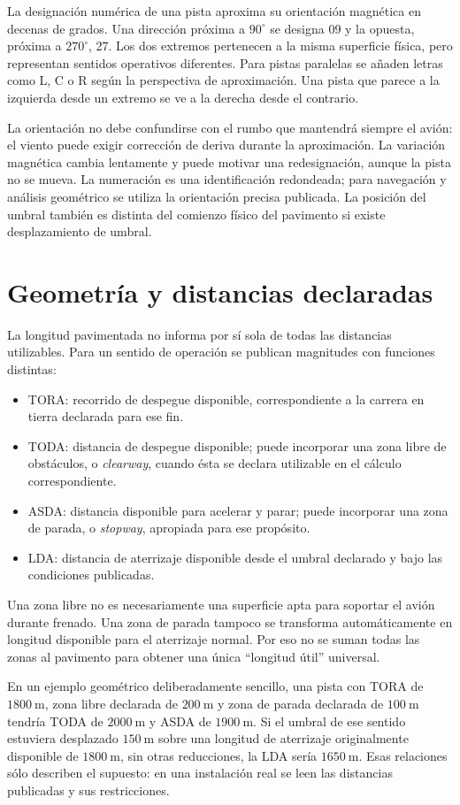 La designación numérica de una pista aproxima su orientación magnética en decenas de grados. Una dirección próxima a $90^\circ$ se designa 09 y la opuesta, próxima a $270^\circ$, 27. Los dos extremos pertenecen a la misma superficie física, pero representan sentidos operativos diferentes. Para pistas paralelas se añaden letras como L, C o R según la perspectiva de aproximación. Una pista que parece a la izquierda desde un extremo se ve a la derecha desde el contrario.

La orientación no debe confundirse con el rumbo que mantendrá siempre el avión: el viento puede exigir corrección de deriva durante la aproximación. La variación magnética cambia lentamente y puede motivar una redesignación, aunque la pista no se mueva. La numeración es una identificación redondeada; para navegación y análisis geométrico se utiliza la orientación precisa publicada. La posición del umbral también es distinta del comienzo físico del pavimento si existe desplazamiento de umbral.

\section{Geometría y distancias declaradas}
La longitud pavimentada no informa por sí sola de todas las distancias utilizables. Para un sentido de operación se publican magnitudes con funciones distintas:
\begin{itemize}
\item TORA: recorrido de despegue disponible, correspondiente a la carrera en tierra declarada para ese fin.
\item TODA: distancia de despegue disponible; puede incorporar una zona libre de obstáculos, o \emph{clearway}, cuando ésta se declara utilizable en el cálculo correspondiente.
\item ASDA: distancia disponible para acelerar y parar; puede incorporar una zona de parada, o \emph{stopway}, apropiada para ese propósito.
\item LDA: distancia de aterrizaje disponible desde el umbral declarado y bajo las condiciones publicadas.
\end{itemize}
Una zona libre no es necesariamente una superficie apta para soportar el avión durante frenado. Una zona de parada tampoco se transforma automáticamente en longitud disponible para el aterrizaje normal. Por eso no se suman todas las zonas al pavimento para obtener una única ``longitud útil'' universal.

En un ejemplo geométrico deliberadamente sencillo, una pista con TORA de $1800\ \mathrm m$, zona libre declarada de $200\ \mathrm m$ y zona de parada declarada de $100\ \mathrm m$ tendría TODA de $2000\ \mathrm m$ y ASDA de $1900\ \mathrm m$. Si el umbral de ese sentido estuviera desplazado $150\ \mathrm m$ sobre una longitud de aterrizaje originalmente disponible de $1800\ \mathrm m$, sin otras reducciones, la LDA sería $1650\ \mathrm m$. Esas relaciones sólo describen el supuesto: en una instalación real se leen las distancias publicadas y sus restricciones.

